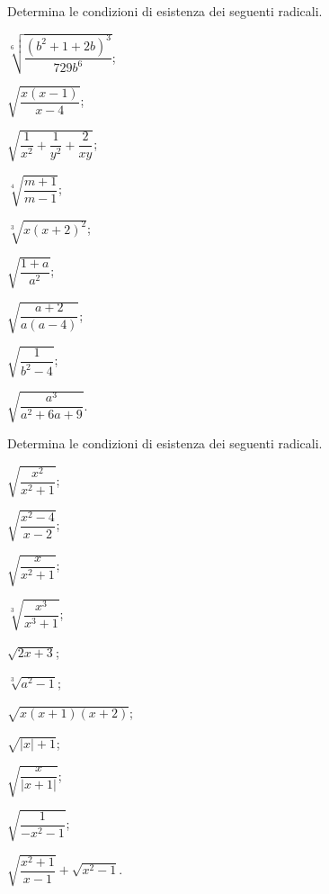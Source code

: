 \begin{esercizio}[\Ast]
Determina le condizioni di esistenza dei seguenti radicali.
 \label{ese:2.15}
 \begin{multicols}{3}
 \begin{enumeratea}
 \item $\sqrt[6]{\dfrac{\left(b^2+1+2b\right)^3}{729b^6}}$;
 \item $\sqrt{\dfrac{x(x-1)}{x-4}}$;
 \item $\sqrt{\dfrac 1{x^2}+\dfrac 1{y^2}+\dfrac 2{xy}}$;
 \item $\sqrt[4]{\dfrac{m+1}{m-1}}$;
 \item $\sqrt[3]{x(x+2)^2}$;
 \item $\sqrt{\dfrac{1+a}{a^2}}$;
 \item $\sqrt{\dfrac{a+2}{a(a-4)}}$;
 \item $\sqrt{\dfrac 1{b^2-4}}$;
 \item $\sqrt{\dfrac{a^3}{a^2+6a+9}}$.
 \end{enumeratea}
 \end{multicols}
\end{esercizio}

\begin{esercizio}[\Ast]
 \label{ese:2.16}
Determina le condizioni di esistenza dei seguenti radicali.
 \begin{multicols}{3}
 \begin{enumeratea}
 \item $\sqrt{\dfrac{x^2}{x^2+1}}$;
 \item $\sqrt{\dfrac{x^2-4}{x-2}}$;
 \item $\sqrt{\dfrac x{x^2+1}}$;
 \item $\sqrt[3]{\dfrac{x^3}{x^3+1}}$;
 \item $\sqrt{2x+3}$;
 \item $\sqrt[3]{a^2-1}$;
 \item $\sqrt{x(x+1)(x+2)}$;
 \item $\sqrt{\left|x\right|+1}$;
 \item $\sqrt{\dfrac x{\left|x+1\right|}}$;
 \item $\sqrt{\dfrac 1{-x^2-1}}$;
 \item $\sqrt{\dfrac{x^2+1}{x-1}}+\sqrt{x^2-1}$.
 \end{enumeratea}
 \end{multicols}
\end{esercizio}

